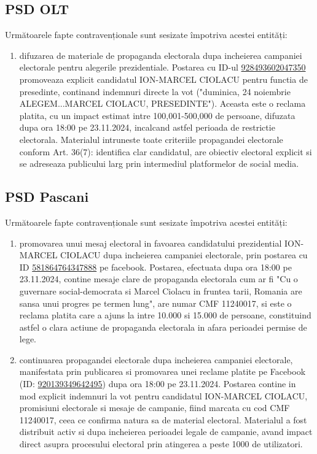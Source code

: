 \documentclass[a4paper,12pt]{article}
\begin{document}
\subsection{PSD OLT}
Următoarele fapte contravenționale sunt sesizate împotriva acestei entități:

\begin{enumerate}[leftmargin=*, label=\arabic*.)]
    \item difuzarea de materiale de propaganda electorala dupa incheierea campaniei electorale pentru alegerile prezidentiale. Postarea cu ID-ul \href{https://www.facebook.com/ads/library/?id=928493602047350}{928493602047350} promoveaza explicit candidatul ION-MARCEL CIOLACU pentru functia de presedinte, continand indemnuri directe la vot ("duminica, 24 noiembrie ALEGEM...MARCEL CIOLACU, PRESEDINTE"). Aceasta este o reclama platita, cu un impact estimat intre 100,001-500,000 de persoane, difuzata dupa ora 18:00 pe 23.11.2024, incalcand astfel perioada de restrictie electorala. Materialul intruneste toate criteriile propagandei electorale conform Art. 36(7): identifica clar candidatul, are obiectiv electoral explicit si se adreseaza publicului larg prin intermediul platformelor de social media.
\end{enumerate}

\vspace{0.5cm}

\subsection{PSD Pascani}
Următoarele fapte contravenționale sunt sesizate împotriva acestei entități:

\begin{enumerate}[leftmargin=*, label=\arabic*.)]
    \item promovarea unui mesaj electoral in favoarea candidatului prezidential ION-MARCEL CIOLACU dupa incheierea campaniei electorale, prin postarea cu ID \href{https://www.facebook.com/ads/library/?id=581864764347888}{581864764347888} pe facebook. Postarea, efectuata dupa ora 18:00 pe 23.11.2024, contine mesaje clare de propaganda electorala cum ar fi "Cu o guvernare social-democrata si Marcel Ciolacu in fruntea tarii, Romania are sansa unui progres pe termen lung", are numar CMF 11240017, si este o reclama platita care a ajuns la intre 10.000 si 15.000 de persoane, constituind astfel o clara actiune de propaganda electorala in afara perioadei permise de lege.
    \item continuarea propagandei electorale dupa incheierea campaniei electorale, manifestata prin publicarea si promovarea unei reclame platite pe Facebook (ID: \href{https://www.facebook.com/ads/library/?id=920139349642495}{920139349642495}) dupa ora 18:00 pe 23.11.2024. Postarea contine in mod explicit indemnuri la vot pentru candidatul ION-MARCEL CIOLACU, promisiuni electorale si mesaje de campanie, fiind marcata cu cod CMF 11240017, ceea ce confirma natura sa de material electoral. Materialul a fost distribuit activ si dupa incheierea perioadei legale de campanie, avand impact direct asupra procesului electoral prin atingerea a peste 1000 de utilizatori.
\end{enumerate}
\end{document}
